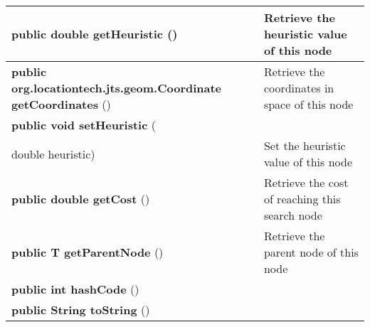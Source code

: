 {\begin{tabular}{ p{3in}|m{3.4in}}
\textbf{public double getHeuristic} () & Retrieve the heuristic value of this node\\ \hline 
\textbf{public org.locationtech.jts.geom.Coordinate getCoordinates} () & Retrieve the coordinates in space of this node\\ \hline 
\textbf{public void setHeuristic } (\\ \hspace*{ 5pt} double heuristic) & Set the heuristic value of this node\\ \hline 
\textbf{public double getCost} () & Retrieve the cost of reaching this search node\\ \hline 
\textbf{public T getParentNode} () & Retrieve the parent node of this node\\ \hline 
\textbf{public int hashCode} () & \\ \hline 
\textbf{public String toString} () & \\ \hline 
\end{tabular}
}
